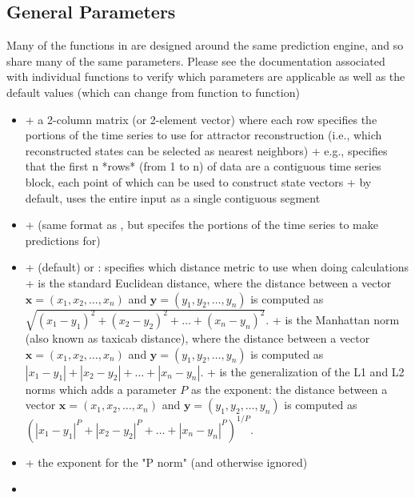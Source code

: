 \documentclass[article]{jss}
\begin{document}
\subsection{General Parameters}\label{sec:general-parameters}

Many of the functions in  are designed around the same prediction engine, and so share many of the same parameters. Please see the documentation associated with individual functions to verify which parameters are applicable as well as the default values (which can change from function to function)

\begin{itemize}
\item {}
  + a 2-column matrix (or 2-element vector) where each row specifies the portions of the time series to use for attractor reconstruction (i.e., which reconstructed states can be selected as nearest neighbors)
  + e.g.,  specifies that the first n *rows* (from 1 to n) of data are a contiguous time series block, each point of which can be used to construct state vectors
  + by default,  uses the entire input as a single contiguous segment
\item {}
  + (same format as , but specifes the portions of the time series to make predictions for)
\item {}
  +  (default) or : specifies which distance metric to use when doing calculations
  +  is the standard Euclidean distance, where the distance between a vector $\mathbf{x} = \left(x_1, x_2, \dots, x_n \right)$ and $\mathbf{y} = \left( y_1, y_2, \dots, y_n \right)$ is computed as $\sqrt{(x_1 - y_1)^2 + (x_2 - y_2)^2 + \dots + (x_n - y_n)^2}$.
  +  is the Manhattan norm (also known as taxicab distance), where the distance between a vector $\mathbf{x} = \left( x_1, x_2, \dots, x_n \right)$ and $\mathbf{y} = \left( y_1, y_2, \dots, y_n \right)$ is computed as $|x_1 - y_1| + |x_2 - y_2| + \dots + |x_n - y_n|$.
  +  is the generalization of the L1 and L2 norms which adds a parameter $P$ as the exponent: the distance between a vector $\mathbf{x} = \left( x_1, x_2, \dots, x_n \right)$ and $\mathbf{y} = \left(y_1, y_2, \dots, y_n \right)$ is computed as ${\left(\left|x_1 - y_1\right|^P + \left|x_2 - y_2\right|^P + \dots + \left|x_n - y_n\right|^P\right)^{1/P}}$.
\item {}
  + the exponent for the "P norm" (and otherwise ignored)
\item {}

\end{itemize}
\end{document}
